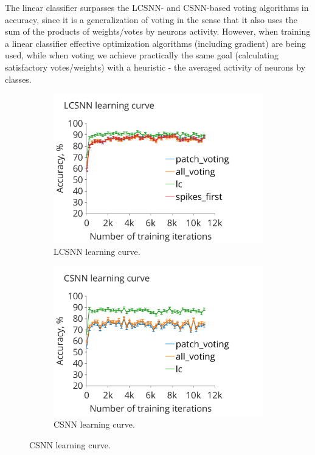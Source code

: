 \documentclass[a4paper,10pt]{article}
\begin{document}
The linear classifier surpasses the LCSNN- and CSNN-based voting algorithms in accuracy, since it is a generalization of voting in the sense that it also uses the sum of the products of weights/votes by neurons activity. However, when training a linear classifier effective optimization algorithms (including gradient) are being used, while when voting we achieve practically the same goal (calculating satisfactory votes/weights) with a heuristic - the averaged activity of neurons by classes.

\begin{figure}
\centering
\begin{subfigure}{0.48\textwidth}
    \includegraphics[width=\textwidth,keepaspectratio=true]{LCSNN_learning_rate.pdf}
 \caption{LCSNN learning curve.}
 \label{LCSNN_learning_curve}
\end{subfigure} 
\begin{subfigure}{0.48\textwidth} 
    \includegraphics[width=\textwidth,keepaspectratio=true]{CSNN_learning_rate.pdf}
 \caption{CSNN learning curve.}
 \label{CSNN_learning_curve}
\end{subfigure} 
\end{figure}
\end{document}
